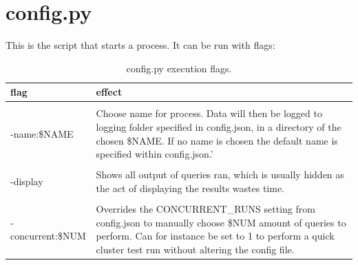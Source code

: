 \documentclass[a4paper,english]{report}
\begin{document}
\section{config.py}
This is the script that starts a process. It can be run with flags:
\begin{table}[H]
	\centering
	\caption{config.py execution flags.}
	\label{table:config_flags}
	\begin{tabular}{p{4cm}p{7cm}}
		\\
		\multicolumn{1}{l}{\bfseries flag} & \multicolumn{1}{l}{\bfseries effect} \\ \hline \\
		-name:\$NAME& Choose name for process. Data will then be logged to logging folder specified in config.json, in a directory of the chosen \$NAME. If no name is chosen the default name is specified within config.json.' \\
		\\
		-display & Shows all output of queries ran, which is usually hidden as the act of displaying the results wastes time. \\
		\\
		-concurrent:\$NUM & Overrides the CONCURRENT\_RUNS setting from config.json to manually choose \$NUM amount of queries to perform. Can for instance be set to 1 to perform a quick cluster test run without altering the config file.  \\
	\end{tabular}
\end{table}
\end{document}
